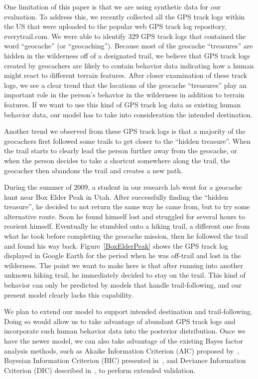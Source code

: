 One limitation of this paper is that we are using synthetic data for our evaluation. To address this, we recently collected all the GPS track logs within the US that were uploaded to the popular web GPS track log repository, everytrail.com. We were able to identify 329 GPS track logs that contained the word ``geocache'' (or ``geocaching''). Because most of the geocache ``treasures'' are hidden in the wilderness off of a designated trail, we believe that GPS track logs created by geocachers are likely to contain behavior data indicating how a human might react to different terrain features. After closer examination of these track logs, we see a clear trend that the locations of the geocache ``treasures'' play an important role in the person's behavior in the wilderness in addition to terrain features. If we want to use this kind of GPS track log data as existing human behavior data, our model has to take into consideration the intended destination.

Another trend we observed from these GPS track logs is that a majority of the geocachers first followed some trails to get closer to the ``hidden treasure''. When the trail starts to clearly lead the person further away from the geocache, or when the person decides to take a shortcut somewhere along the trail, the geocacher then abandons the trail and creates a new path.

During the summer of 2009, a student in our research lab went for a geocache hunt near Box Elder Peak in Utah. After successfully finding the ``hidden treasure'', he decided to not return the same way he came from, but to try some alternative route. Soon he found himself lost and struggled for several hours to reorient himself. Eventually he stumbled onto a hiking trail, a different one from what he took before completing the geocache mission, then he followed the trail and found his way back. Figure~\ref{BoxElderPeak} shows the GPS track log displayed in Google Earth for the period when he was off-trail and lost in the wilderness. The point we want to make here is that after running into another unknown hiking trail, he immediately decided to stay on the trail. This kind of behavior can only be predicted by models that handle trail-following, and our present model clearly lacks this capability.

We plan to extend our model to support intended destination and trail-following. Doing so would allow us to take advantage of abundant GPS track logs and incorporate such human behavior data into the posterior distribution. Once we have the newer model, we can also take advantage of the existing Bayes factor analysis methods, such as Akaike Information Criterion (AIC) proposed by~\cite{Akaike1974AIC}, Bayesian Information Criterion (BIC) presented in~\cite{Schwarz1978BIC}, and Deviance Information Criterion (DIC) described in~\cite{Spiegelhalter2002DIC}, to perform extended validation.

